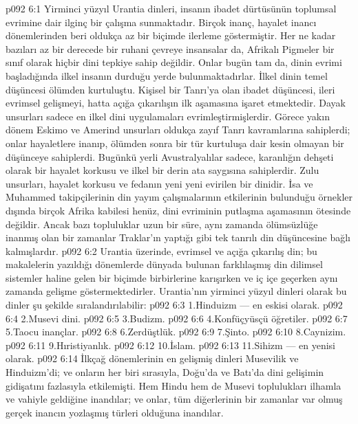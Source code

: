 \vs p092 6:1 Yirminci yüzyıl Urantia dinleri, insanın ibadet dürtüsünün toplumsal evrimine dair ilginç bir çalışma sunmaktadır. Birçok inanç, hayalet inancı dönemlerinden beri oldukça az bir biçimde ilerleme göstermiştir. Her ne kadar bazıları az bir derecede bir ruhani çevreye insansalar da, Afrikalı Pigmeler bir sınıf olarak hiçbir dini tepkiye sahip değildir. Onlar bugün tam da, dinin evrimi başladığında ilkel insanın durduğu yerde bulunmaktadırlar. İlkel dinin temel düşüncesi ölümden kurtuluştu. Kişisel bir Tanrı’ya olan ibadet düşüncesi, ileri evrimsel gelişmeyi, hatta açığa çıkarılışın ilk aşamasına işaret etmektedir. Dayak unsurları sadece en ilkel dini uygulamaları evrimleştirmişlerdir. Görece yakın dönem Eskimo ve Amerind unsurları oldukça zayıf Tanrı kavramlarına sahiplerdi; onlar hayaletlere inanıp, ölümden sonra bir tür kurtuluşa dair kesin olmayan bir düşünceye sahiplerdi. Bugünkü yerli Avustralyalılar sadece, karanlığın dehşeti olarak bir hayalet korkusu ve ilkel bir derin ata saygısına sahiplerdir. Zulu unsurları, hayalet korkusu ve fedanın yeni yeni evirilen bir dinidir. İsa ve Muhammed takipçilerinin din yayım çalışmalarının etkilerinin bulunduğu örnekler dışında birçok Afrika kabilesi henüz, dini evriminin putlaşma aşamasının ötesinde değildir. Ancak bazı topluluklar uzun bir süre, aynı zamanda ölümsüzlüğe inanmış olan bir zamanlar Traklar’ın yaptığı gibi tek tanrılı din düşüncesine bağlı kalmışlardır.
\vs p092 6:2 Urantia üzerinde, evrimsel ve açığa çıkarılış din; bu makalelerin yazıldığı dönemlerde dünyada bulunan farklılaşmış din dilimsel sistemler haline gelen bir biçimde birbirlerine karışırken ve iç içe geçerken aynı zamanda gelişme göstermektedirler. Urantia’nın yirminci yüzyıl dinleri olarak bu dinler şu şekilde sıralandırılabilir:
\vs p092 6:3 1.\bibnobreakspace Hinduizm --- en eskisi olarak.
\vs p092 6:4 2.\bibnobreakspace Musevi dini.
\vs p092 6:5 3.\bibnobreakspace Budizm.
\vs p092 6:6 4.\bibnobreakspace Konfüçyüsçü öğretiler.
\vs p092 6:7 5.\bibnobreakspace Taocu inançlar.
\vs p092 6:8 6.\bibnobreakspace Zerdüştlük.
\vs p092 6:9 7.\bibnobreakspace Şinto.
\vs p092 6:10 8.\bibnobreakspace Caynizim.
\vs p092 6:11 9.\bibnobreakspace Hıristiyanlık.
\vs p092 6:12 10.\bibnobreakspace İslam.
\vs p092 6:13 11.\bibnobreakspace Sihizm --- en yenisi olarak.
\vs p092 6:14 İlkçağ dönemlerinin en gelişmiş dinleri Musevilik ve Hinduizm’di; ve onların her biri sırasıyla, Doğu’da ve Batı’da dini gelişimin gidişatını fazlasıyla etkilemişti. Hem Hindu hem de Musevi toplulukları ilhamla ve vahiyle geldiğine inandılar; ve onlar, tüm diğerlerinin bir zamanlar var olmuş gerçek inancın yozlaşmış türleri olduğuna inandılar.
